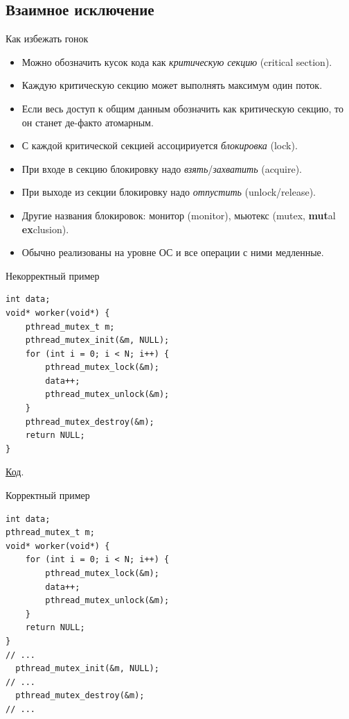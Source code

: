 \subsection{Взаимное исключение}

\begin{frame}
\end{frame}

\begin{frame}{Как избежать гонок}
	\begin{itemize}
		\item Можно обозначить кусок кода как \textit{критическую секцию} (critical section).
		\item Каждую критическую секцию может выполнять максимум один поток.
		\item
			Если весь доступ к общим данным обозначить как критическую секцию,
			то он станет де-факто атомарным.
		\item С каждой критической секцией ассоцириуется \textit{блокировка} (lock).
		\item При входе в секцию блокировку надо \textit{взять}/\textit{захватить} (acquire).
		\item При выходе из секции блокировку надо \textit{отпустить} (unlock/release).
		\item Другие названия блокировок: монитор (monitor), мьютекс (mutex, \textbf{mut}al \textbf{ex}clusion).
		\item Обычно реализованы на уровне ОС и все операции с ними медленные.
	\end{itemize}
\end{frame}

\begin{frame}[fragile]{Некорректный пример}
\begin{verbatim}
int data;
void* worker(void*) {
    pthread_mutex_t m;
    pthread_mutex_init(&m, NULL);
    for (int i = 0; i < N; i++) {
        pthread_mutex_lock(&m);
        data++;
        pthread_mutex_unlock(&m);
    }
    pthread_mutex_destroy(&m);
    return NULL;
}
\end{verbatim}
\href{https://github.com/yeputons/fall-2017-paradigms/raw/master/171023/sources/09-two-threads-bad-mutex.cpp}{Код}.
\end{frame}

\begin{frame}[fragile]{Корректный пример}
\begin{verbatim}
int data;
pthread_mutex_t m;
void* worker(void*) {
    for (int i = 0; i < N; i++) {
        pthread_mutex_lock(&m);
        data++;
        pthread_mutex_unlock(&m);
    }
    return NULL;
}
// ...
  pthread_mutex_init(&m, NULL);
// ...
  pthread_mutex_destroy(&m);
// ...
\end{verbatim}
\end{frame}

